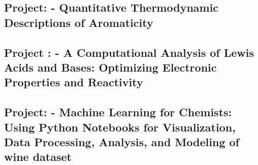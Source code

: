 \documentclass[12pt]{article}
\begin{document}

\newpage

\newpage

\newpage
\tableofcontents
\newpage


\newpage
{} 


\vspace*{\fill}
\begin{center}
    \section{Project: \MakeUppercase{} -  Quantitative Thermodynamic Descriptions of Aromaticity}\cite{quantitative_thermodynamic_aromaticity_2005}
    \label{project1}
\end{center}
\vspace*{\fill}

\newpage


\newpage
\vspace*{\fill}
\begin{center}
    \section{Project : \MakeUppercase{} - A Computational Analysis of Lewis Acids and Bases: Optimizing Electronic Properties and Reactivity}\cite{anderson_lewis_acid_base_2000}
    \label{project2section}
\end{center}
\vspace*{\fill}

\newpage


\newpage
\vspace*{\fill}
\begin{center}
    \section{Project: \MakeUppercase{} - Machine Learning for Chemists: Using Python Notebooks for Visualization, Data Processing, Analysis, and Modeling of wine dataset}\cite{lafuente_gentle_ml_2021}
\end{center}
\vspace*{\fill}
\end{document}
